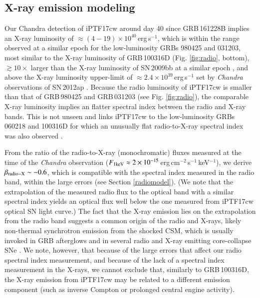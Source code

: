 \documentclass[twocolumn]{emulateapj}
\begin{document}
\subsection{X-ray emission modeling}
Our Chandra detection of iPTF17cw around day 40 since GRB\,161228B implies an X-ray luminosity of $\approx (4-19)\times10^{40}$\,erg\,s$^{-1}$, which is within the range observed at a similar
epoch for the low-luminosity GRBs 980425 and 031203, most similar to the X-ray luminosity of GRB\,100316D  (Fig. \ref{fig:radio}, bottom), $\gtrsim 10\times$ larger than the X-ray luminosity of SN\,2009bb at a similar epoch \citep{Soderberg2010}, and above the X-ray luminosity upper-limit of $\approx 2.4\times10^{39}$\,erg\,s$^{-1}$ set by \textit{Chandra} observations of SN\,2012ap \citep{Margutti2014}. Because the radio luminosity of iPTF17cw is smaller than that of GRB\,980425
and GRB\,031203 (see Fig. \ref{fig:radio}), the comparable X-ray luminosity implies an flatter spectral index between the radio and X-ray bands. This is not unseen and links iPTF17cw to the low-luminosity GRBs 060218 and 100316D for which an unusually  flat radio-to-X-ray spectral index was also observed \citep[see ][for a discussion]{Margutti2013}.

From the ratio of the radio-to-X-ray (monochromatic) fluxes measured at the time of the \textit{Chandra} observation ($F_{\rm 1 keV}\approx 2\times10^{-15}$\,erg\,cm$^{-2}$\,s$^{-1}$\,keV$^{-1}$), we derive $\beta_{\rm radio-X}\sim -0.6$, which is compatible with the spectral index measured in the radio band, within the large errors (see Section \ref{radiomodel}). (We note that the extrapolation of the measured radio flux to the optical band with a similar spectral index yields an optical flux well below the one measured from iPTF17cw optical SN light curve.) The fact that the X-ray emission lies on the extrapolation from the radio band suggests a common origin of the radio and X-rays, likely  non-thermal synchrotron emission from the shocked CSM, which is usually invoked in GRB afterglows and in several radio and X-ray emitting core-collapse SNe \citep{Chevalier2006}.  We note, however, that because of the large errors that affect our radio spectral index measurement, and because of the lack of a spectral index measurement in the X-rays, we cannot exclude that, similarly to GRB\,100316D, the X-ray emission from iPTF17cw may be related to a different emission component (such as inverse Compton or prolonged central engine activity).
\end{document}
